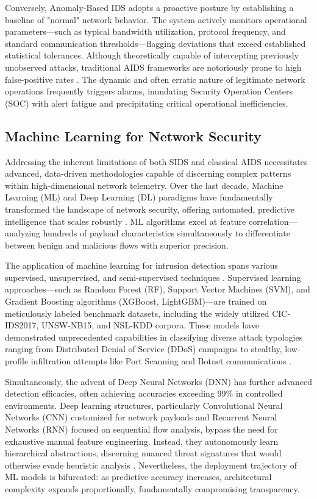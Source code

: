 \documentclass[conference]{IEEEtran}
\begin{document}
Conversely, Anomaly-Based IDS adopts a proactive posture by establishing a baseline of "normal" network behavior. The system actively monitors operational parameters—such as typical bandwidth utilization, protocol frequency, and standard communication thresholds—flagging deviations that exceed established statistical tolerances. Although theoretically capable of intercepting previously unobserved attacks, traditional AIDS frameworks are notoriously prone to high false-positive rates \cite{mahbooba2021explainable}. The dynamic and often erratic nature of legitimate network operations frequently triggers alarms, inundating Security Operation Centers (SOC) with alert fatigue and precipitating critical operational inefficiencies.

\subsection{Machine Learning for Network Security}
Addressing the inherent limitations of both SIDS and classical AIDS necessitates advanced, data-driven methodologies capable of discerning complex patterns within high-dimensional network telemetry. Over the last decade, Machine Learning (ML) and Deep Learning (DL) paradigms have fundamentally transformed the landscape of network security, offering automated, predictive intelligence that scales robustly \cite{alotaibi2023adaptive, chen2016xgboost}. ML algorithms excel at feature correlation—analyzing hundreds of payload characteristics simultaneously to differentiate between benign and malicious flows with superior precision. 

The application of machine learning for intrusion detection spans various supervised, unsupervised, and semi-supervised techniques \cite{ke2017lightgbm, ahmad2020network}. Supervised learning approaches—such as Random Forest (RF), Support Vector Machines (SVM), and Gradient Boosting algorithms (XGBoost, LightGBM)—are trained on meticulously labeled benchmark datasets, including the widely utilized CIC-IDS2017, UNSW-NB15, and NSL-KDD corpora. These models have demonstrated unprecedented capabilities in classifying diverse attack typologies ranging from Distributed Denial of Service (DDoS) campaigns to stealthy, low-profile infiltration attempts like Port Scanning and Botnet communications \cite{wang2021explainable}.

Simultaneously, the advent of Deep Neural Networks (DNN) has further advanced detection efficacies, often achieving accuracies exceeding 99\% in controlled environments. Deep learning structures, particularly Convolutional Neural Networks (CNN) customized for network payloads and Recurrent Neural Networks (RNN) focused on sequential flow analysis, bypass the need for exhaustive manual feature engineering. Instead, they autonomously learn hierarchical abstractions, discerning nuanced threat signatures that would otherwise evade heuristic analysis \cite{lundberg2017unified}. Nevertheless, the deployment trajectory of ML models is bifurcated: as predictive accuracy increases, architectural complexity expands proportionally, fundamentally compromising transparency.
\end{document}
